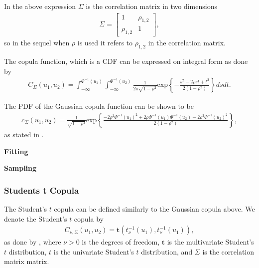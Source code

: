 In the above expression $\Sigma$ is the correlation matrix in two dimensions 
\begin{align*}
    \Sigma = 
    \begin{bmatrix}
            1 & \rho_{1,2} \\
            \rho_{1,2} & 1
    \end{bmatrix},
\end{align*}
so in the sequel when $\rho$ is used it refers to $\rho_{1,2}$ in the correlation matrix.

The copula function, which is a \gls{CDF} can be expressed on integral form as done by \citet[p.~112]{Umberto2004copulaMethods}
\begin{align*}
     C_{\Sigma} (u_1,u_2)
    = \int_{-\infty}^{\Phi^{-1}(u_1)}\int_{-\infty}^{\Phi^{-1}(u_2)}
    \frac{1}{2\pi\sqrt{1-\rho^2}} \mathrm{exp}\left\{ - \frac{s^2-2\rho st+t^2}{2(1-\rho^2)}   \right\} dsdt.
\end{align*} 

The \gls{PDF} of the Gaussian copula function can be shown to be 
\begin{align*}
     c_{\Sigma} (u_1,u_2)
    = \frac{1}{\sqrt{1-\rho^2}} \mathrm{exp}\left\{  \frac{-2\rho^2\Phi^{-1}(u_1)^2  +2\rho \Phi^{-1}(u_1)\Phi^{-1}(u_2) -2\rho^2\Phi^{-1}(u_2)^2}{2(1-\rho^2)}   \right\},
\end{align*}
as stated in \citet[p.267]{Alexander2008}.



\textbf{Fitting}


\textbf{Sampling}


\subsubsection{Students t Copula} \citet[p.~116]{Umberto2004copulaMethods} 
The Student's $t$ copula can be defined similarly to the Gaussian copula above. We denote the Student's $t$ copula by 
\begin{align*}
    C_{\nu,\Sigma}(u_1,u_2) = \boldsymbol{t}(t_\nu^{-1}(u_1),t_\nu^{-1}(u_1)),
\end{align*}
as done by \citet[p.~268]{Alexander2008}, where $\nu >0$ is the degrees of freedom, $\boldsymbol{t}$ is the multivariate Student's $t$ distribution, $t$ is the univariate Student's $t$ distribution, and $\Sigma$ is the correlation matrix matrix.

